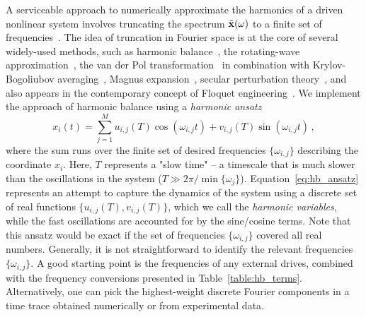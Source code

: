 A serviceable approach to numerically approximate the harmonics of a driven nonlinear system involves truncating the spectrum  $\tilde{\vb{x}}(\omega)$ to a finite set of frequencies~\cite{Guckenheimer_Holmes}. The idea of truncation in Fourier space is at the core of several widely-used methods, such as harmonic balance~\cite{Krack_2019, Luo_2012}, the rotating-wave approximation~\cite{Gardiner2004}, the van der Pol transformation~\cite{Rand_2005} in combination with Krylov-Bogoliubov averaging~\cite{Nayfeh_2008}, Magnus expansion~\cite{Mikami_2016, Eckardt_2015}, secular perturbation theory~\cite{Lifshitz_2008}, and also appears in the contemporary concept of Floquet engineering~\cite{Rudner_2020, Goldman_2014}. We implement the approach of harmonic balance using a \textit{harmonic ansatz}~\cite{Sarrouy_2011, Guskov_2007}
%
\begin{equation} \label{eq:hb_ansatz}
x_i(t) = \sum_{j=1}^M u_{i,j}  (T)  \cos(\omega_{i,j} t)+ v_{i,j} (T) \sin(\omega_{i,j} t) \,,
\end{equation}
%
where the sum runs over the finite set of desired frequencies $\{\omega_{i,j}\}$ describing the coordinate $x_i$. Here, $T$ represents a "slow time" -- a timescale that is much slower than the oscillations in the system ($T\gg 2\pi/\min \{\omega_j\}$).
Equation~\eqref{eq:hb_ansatz} represents an attempt to capture the dynamics of the system using a discrete set of real functions $\{u_{i,j}(T),v_{i,j}(T)\}$, which we call the \textit{harmonic variables}, while the fast oscillations are accounted for by the sine/cosine terms. Note that this ansatz would be exact if the set of frequencies $\{\omega_{i,j}\}$ covered all real numbers. Generally, it is not straightforward to identify the relevant frequencies $\{\omega_{i,j}\}$. A good starting point is the frequencies of any external drives, combined with the frequency conversions presented in Table~\ref{table:hb_terms}. Alternatively, one can pick the highest-weight discrete Fourier components in a time trace obtained numerically or from experimental data.

